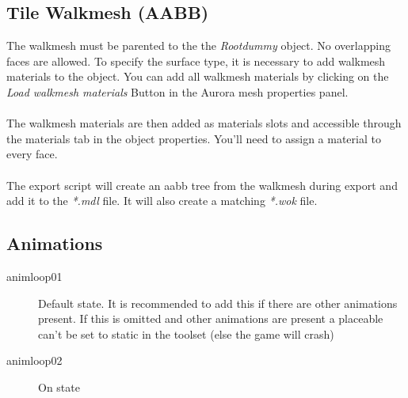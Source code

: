 \subsection*{Tile Walkmesh (AABB)}
The walkmesh must be parented to the the {\textit{Rootdummy}} object.
No overlapping faces are allowed. To specify the surface type, it is necessary
to add walkmesh materials to the object. You can add all walkmesh
materials by clicking on the {\textit{Load walkmesh materials}} Button in the
Aurora mesh properties panel. \\ \\

The walkmesh materials are then added as materials slots and accessible
through the materials tab in the object properties. You'll need to assign
a material to every face. \\ \\

The export script will create an aabb tree from the walkmesh during export
and add it to the {\textit{*.mdl}} file. It will also create a
matching {\textit{*.wok}} file.

\subsection*{Animations}
\begin{description}
    \item[animloop01] Default state. It is recommended to add this if there are other animations present. If this is omitted and other animations are present a placeable can't be set to static in the toolset (else the game will crash)
    \item[animloop02] On state
\end{description}
